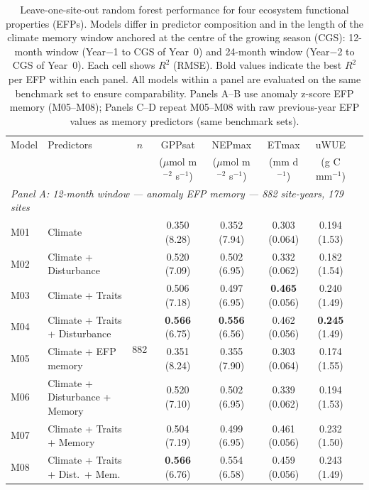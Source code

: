 \begin{table}[htbp]
\centering
\caption{Leave-one-site-out random forest performance for four ecosystem
functional properties (EFPs). Models differ in predictor composition and in the
length of the climate memory window anchored at the centre of the growing season
(CGS): 12-month window (Year$-$1 to CGS of Year~0) and 24-month window
(Year$-$2 to CGS of Year~0). Each cell shows $R^2$ (RMSE). Bold values indicate
the best $R^2$ per EFP within each panel. All models within a panel are evaluated
on the same benchmark set to ensure comparability. Panels A--B use anomaly
z-score EFP memory (M05--M08); Panels C--D repeat M05--M08 with raw
previous-year EFP values as memory predictors (same benchmark sets).}
\label{tab:RF_LOSO}
\small
\begin{tabular}{llcccccc}
\toprule
Model & Predictors & $n$ &
  GPPsat & NEPmax & ETmax & uWUE \\
  & & &
  ($\mu$mol m$^{-2}$ s$^{-1}$) &
  ($\mu$mol m$^{-2}$ s$^{-1}$) &
  (mm d$^{-1}$) &
  (g C mm$^{-1}$) \\
\midrule
\multicolumn{7}{l}{\textit{Panel A: 12-month window --- anomaly EFP memory --- 882 site-years, 179 sites}} \\
\midrule
M01 & Climate                          & \multirow{8}{*}{882} & 0.350 (8.28) & 0.352 (7.94) & 0.303 (0.064) & 0.194 (1.53) \\
M02 & Climate + Disturbance            &                      & 0.520 (7.09) & 0.502 (6.95) & 0.332 (0.062) & 0.182 (1.54) \\
M03 & Climate + Traits                 &                      & 0.506 (7.18) & 0.497 (6.95) & \textbf{0.465} (0.056) & 0.240 (1.49) \\
M04 & Climate + Traits + Disturbance   &                      & \textbf{0.566} (6.75) & \textbf{0.556} (6.56) & 0.462 (0.056) & \textbf{0.245} (1.49) \\
M05 & Climate + EFP memory             &                      & 0.351 (8.24) & 0.355 (7.90) & 0.303 (0.064) & 0.174 (1.55) \\
M06 & Climate + Disturbance + Memory   &                      & 0.520 (7.10) & 0.502 (6.95) & 0.339 (0.062) & 0.194 (1.53) \\
M07 & Climate + Traits + Memory        &                      & 0.504 (7.19) & 0.499 (6.95) & 0.461 (0.056) & 0.232 (1.50) \\
M08 & Climate + Traits + Dist.\ + Mem. &                      & \textbf{0.566} (6.76) & 0.554 (6.58) & 0.459 (0.056) & 0.243 (1.49) \\

\end{tabular}
\end{table}
